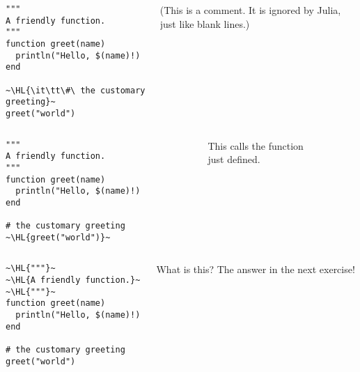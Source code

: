 \documentclass[english,serif,mathserif,xcolor=pdftex,dvipsnames,table]{beamer}
\begin{document}
\begin{frame}[fragile]
  \begin{columns}[t]
    \begin{column}{0.5\textwidth}
\begin{lstlisting}
"""
A friendly function.
"""
function greet(name)
  println("Hello, $(name)!)
end

~\HL{\it\tt\#\ the customary greeting}~
greet("world")
\end{lstlisting}
    \end{column}
    \begin{column}{0.5\textwidth}
      \raggedleft
       (This is a comment. It is ignored by Julia, just like blank lines.)
    \end{column}
  \end{columns}
\end{frame}


\begin{frame}[fragile]
  \begin{columns}[t]
    \begin{column}{0.5\textwidth}
\begin{lstlisting}
"""
A friendly function.
"""
function greet(name)
  println("Hello, $(name)!)
end

# the customary greeting
~\HL{greet("world")}~
\end{lstlisting}
    \end{column}
    \begin{column}{0.5\textwidth}
      \raggedleft
      This calls the function \\ just defined.
    \end{column}
  \end{columns}
\end{frame}


\begin{frame}[fragile]
  \begin{columns}[t]
    \begin{column}{0.5\textwidth}
\begin{lstlisting}
~\HL{"""}~
~\HL{A friendly function.}~
~\HL{"""}~
function greet(name)
  println("Hello, $(name)!)
end

# the customary greeting
greet("world")
\end{lstlisting}
    \end{column}
    \begin{column}{0.5\textwidth}
      \raggedleft
      What is this? The answer in the next exercise!
    \end{column}
  \end{columns}
\end{frame}
\end{document}
